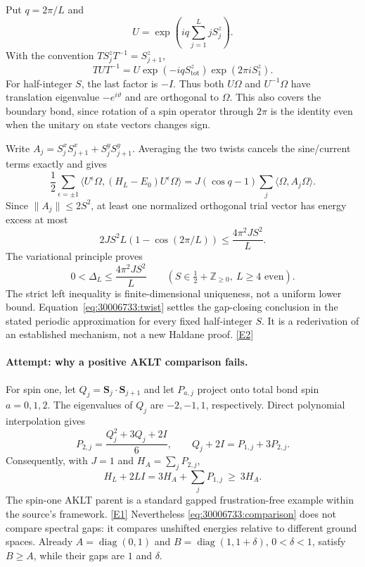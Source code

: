 \documentclass[11pt,a4paper]{article}
\newcommand{\Z}{\mathbb{Z}}
\newcommand{\eref}[2]{\hyperlink{extra:#1:#2}{[E#2]}}
\numberwithin{equation}{section}
\begin{document}
Put $q=2\pi/L$ and
\[
 U=\exp\left(iq\sum_{j=1}^L jS_j^z\right).
\]
With the convention $TS_j^zT^{-1}=S_{j+1}^z$,
\[
 TUT^{-1}=U\exp(-iqS_{\mathrm{tot}}^z)\exp(2\pi iS_1^z).
\]
For half-integer $S$, the last factor is $-I$. Thus both $U\Omega$ and
$U^{-1}\Omega$ have translation eigenvalue $-e^{i\vartheta}$ and are
orthogonal to $\Omega$. This also covers the boundary bond, since rotation
of a spin operator through $2\pi$ is the identity even when the unitary on
state vectors changes sign.

Write $A_j=S_j^xS_{j+1}^x+S_j^yS_{j+1}^y$. Averaging the two twists cancels
the sine/current terms exactly and gives
\[
 \frac12\sum_{\epsilon=\pm1}
 \langle U^\epsilon\Omega,(H_L-E_0)U^\epsilon\Omega\rangle
 =J(\cos q-1)\sum_j\langle\Omega,A_j\Omega\rangle.
\]
Since $\|A_j\|\leq2S^2$, at least one normalized orthogonal trial vector has
energy excess at most
\[
 2JS^2L(1-\cos(2\pi/L))\leq\frac{4\pi^2JS^2}{L}.
\]
The variational principle proves
\begin{equation}\label{eq:30006733:twist}
 0<\Delta_L\leq\frac{4\pi^2JS^2}{L}
 \qquad(S\in\tfrac12+\Z_{\geq0},\ L\geq4\text{ even}).
\end{equation}
The strict left inequality is finite-dimensional uniqueness, not a uniform
lower bound. Equation~\eqref{eq:30006733:twist} settles the gap-closing conclusion
in the stated periodic approximation for every fixed half-integer $S$.
It is a rederivation of an established mechanism, not a new Haldane proof.
\eref{30006733}{2}

\paragraph{Attempt: why a positive AKLT comparison fails.}
For spin one, let $Q_j=\mathbf S_j\cdot\mathbf S_{j+1}$ and let $P_{a,j}$
project onto total bond spin $a=0,1,2$. The eigenvalues of $Q_j$ are
$-2,-1,1$, respectively. Direct polynomial interpolation gives
\[
 P_{2,j}=\frac{Q_j^2+3Q_j+2I}{6},\qquad
 Q_j+2I=P_{1,j}+3P_{2,j}.
\]
Consequently, with $J=1$ and $H_A=\sum_jP_{2,j}$,
\begin{equation}\label{eq:30006733:comparison}
 H_L+2LI=3H_A+\sum_jP_{1,j}\ \geq\ 3H_A.
\end{equation}
The spin-one AKLT parent is a standard gapped frustration-free example
within the source's framework. \eref{30006733}{1}
Nevertheless \eqref{eq:30006733:comparison} does not compare spectral gaps:
it compares unshifted energies relative to different ground spaces.
Already $A=\operatorname{diag}(0,1)$ and
$B=\operatorname{diag}(1,1+\delta)$, $0<\delta<1$, satisfy $B\geq A$,
while their gaps are $1$ and $\delta$.
\end{document}

